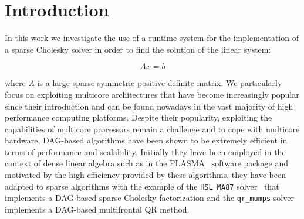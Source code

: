 \documentclass{article}
\begin{document}
\newpage
\setcounter{page}{1}

\section{Introduction} \label{sec:introduction} 



In this work we investigate the use of a runtime system for the
implementation of a sparse Cholesky solver in order to find the
solution of the linear system:

\begin{equation}\label{eq:ch}
  Ax = b
\end{equation}

where $A$ is a large sparse symmetric positive-definite matrix. We
particularly focus on exploiting multicore architectures that have
become increasingly popular since their introduction and can be found
nowadays in the vast majority of high performance computing
platforms. Despite their popularity, exploiting the capabilities of
multicore processors remain a challenge and to cope with multicore
hardware, DAG-based algorithms have been shown to be extremely
efficient in terms of performance and scalability. Initially they have
been employed in the context of dense linear algebra such as in the
PLASMA~\cite{a.d.d.h.ea:09} software package and motivated by the high
efficiency provided by these algorithms, they have been adapted to
sparse algorithms with the example of the \texttt{HSL\_MA87}
solver~\cite{h.r.s:10} that implements a DAG-based sparse Cholesky
factorization and the \texttt{qr\_mumps} solver~\cite{b:13} implements
a DAG-based multifrontal QR method.
\end{document}
